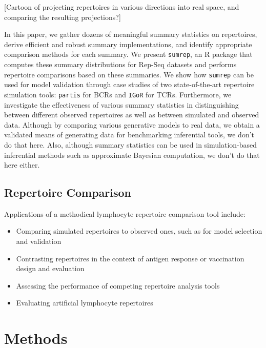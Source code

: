 \documentclass{article}
\begin{document}
[Cartoon of projecting repertoires in various directions into real space, and comparing the resulting projections?]

In this paper, we gather dozens of meaningful summary statistics on repertoires, derive efficient and robust summary implementations, and identify appropriate comparison methods for each summary.
We present \texttt{sumrep}, an R package that computes these summary distributions for Rep-Seq datasets and performs repertoire comparisons based on these summaries.
We show how \texttt{sumrep} can be used for model validation through case studies of two state-of-the-art repertoire simulation tools: \texttt{partis} \cite{Ralph2016-nw, Ralph2016-iz} for BCRs and \texttt{IGoR} \cite{Marcou2018-du} for TCRs.
Furthermore, we investigate the effectiveness of various summary statistics in distinguishing between different observed repertoires as well as between simulated and observed data.
Although by comparing various generative models to real data, we obtain a validated means of generating data for benchmarking inferential tools, we don't do that here.
Also, although summary statistics can be used in simulation-based inferential methods such as approximate Bayesian computation, we don't do that here either.

\subsection*{Repertoire Comparison}

Applications of a methodical lymphocyte repertoire comparison tool include:
\begin{itemize}
\item Comparing simulated repertoires to observed ones, such as for model selection and validation
\item Contrasting repertoires in the context of antigen response or vaccination design and evaluation
\item Assessing the performance of competing repertoire analysis tools
\item Evaluating artificial lymphocyte repertoires \cite{Finlay2012}
\end{itemize}

\section*{Methods}
\end{document}
